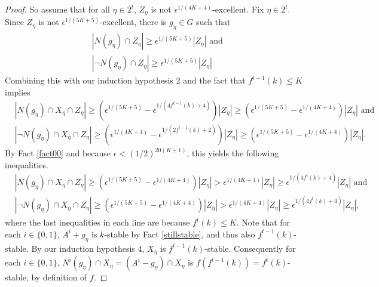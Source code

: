 \documentclass[11pt]{article}
\theoremstyle{definition}
\begin{document}
\begin{proof}
So assume that for all $\eta \in 2^t$, $Z_{\eta}$ is not $\epsilon^{1/(4K+4)}$-excellent.   Fix $\eta \in 2^t$.  Since $Z_{\eta}$ is not $\epsilon^{1/(5K+5)}$-excellent, there is $g_{\eta}\in G$ such that 
\begin{align*}
&|N(g_{\eta})\cap Z_{\eta}|\geq \epsilon^{1/(5K+5)}|Z_{\eta}| \text{ and }\\
&|\neg N(g_{\eta})\cap Z_{\eta}|\geq \epsilon^{1/(5K+5)}|Z_{\eta}|
\end{align*}
Combining this with our induction hypothesis 2 and the fact that $f^{t-1}(k)\leq K$ implies 
\begin{align*}
&|N(g_{\eta})\cap X_{\eta}\cap Z_{\eta}|\geq(\epsilon^{1/(5K+5)}-\epsilon^{1/(4f^{t-1}(k)+4)})|Z_{\eta}| \geq (\epsilon^{1/(5K+5)}-\epsilon^{1/(4K+4)})|Z_{\eta}|\text{ and }\\
&|\neg N(g_{\eta})\cap X_{\eta}\cap Z_{\eta}|\geq(\epsilon^{1/(4K+4)}-\epsilon^{1/(2f^{t-1}(k)+2)})|Z_{\eta}|\geq (\epsilon^{1/(5K+5)}-\epsilon^{1/(4K+4)})|Z_{\eta}|.
\end{align*}
By Fact \ref{fact00} and because $\epsilon<(1/2)^{20(K+1)}$, this yields the following inequalities.  
\begin{align}
&|N(g_{\eta})\cap X_{\eta}\cap Z_{\eta}|\geq (\epsilon^{1/(5K+5)}-\epsilon^{1/(4K+4)})|Z_{\eta}|>\epsilon^{1/(4K+4)}|Z_{\eta}|\geq \epsilon^{1/(4f^t(k)+4)}|Z_{\eta}|\text{ and }\label{large1}\\
&|\neg N(g_{\eta})\cap X_{\eta}\cap Z_{\eta}|\geq(\epsilon^{1/(5K+5)}-\epsilon^{1/(4K+4)})|Z_{\eta}|>\epsilon^{1/(4K+4)}|Z_{\eta}|\geq \epsilon^{1/(4f^t(k)+4)}|Z_{\eta}|,\label{large2}
\end{align}
where the last inequalities in each line are because $f^t(k)\leq K$. Note that for each $i\in \{0,1\}$, $A^i+g_{\eta}$ is $k$-stable by Fact \ref{stillstable}, and thus also $f^{t-1}(k)$-stable.  By our induction hypothesis 4, $X_{\eta}$ is $f^{t-1}(k)$-stable.  Consequently for each $i\in \{0,1\}$, $N^i(g_{\eta})\cap X_{\eta}=(A^i-g_{\eta})\cap X_{\eta}$ is $f(f^{t-1}(k))=f^t(k)$-stable, by definition of $f$.


\end{proof}
\end{document}
